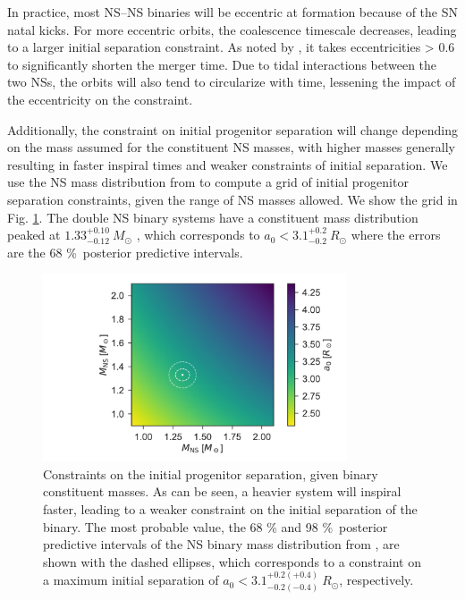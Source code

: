 \documentclass[longauth]{aa}    %
\begin{document}
In practice, most NS--NS binaries will be eccentric at formation because of the SN
natal kicks. For more eccentric orbits, the coalescence timescale decreases,
leading to a larger initial separation constraint. As noted by
\citet{Postnov2014}, it takes eccentricities > 0.6 to significantly shorten the
merger time. Due to tidal interactions between the two NSs, the orbits will also
tend to circularize with time, lessening the impact of the eccentricity on the
constraint.

Additionally, the constraint on initial progenitor separation will change
depending on the mass assumed for the constituent NS masses, with higher masses
generally resulting in faster inspiral times and weaker constraints of initial
separation. We use the NS mass distribution from \citet{Kiziltan2013} to compute
a grid of initial progenitor separation constraints, given the range of NS
masses allowed. We show the grid in Fig. \ref{fig:prog_sep}. The double NS
binary systems have a constituent mass distribution peaked at
$1.33^{+0.10}_{-0.12}~M_\odot$ \citep{Kiziltan2013}, which corresponds to  $a_0 <
3.1^{+0.2}_{-0.2}~R_\odot$ where the errors are the 68 \%\ posterior
predictive intervals.

\begin{figure}
        \centering
       \includegraphics[width=9cm]{figures/prog_sep.pdf}
        \caption{Constraints on the initial progenitor separation, given binary constituent masses. As can be seen, a heavier system will inspiral faster, leading to a weaker constraint on the initial separation of the binary. The most probable value, the 68 \% and 98 \%\ posterior predictive intervals of the NS binary mass distribution from \citet{Kiziltan2013}, are shown with the dashed ellipses, which corresponds to a constraint on a maximum initial separation of $a_0 <3.1^{+0.2(+0.4)}_{-0.2(-0.4)}~R_\odot$, respectively.}
        \label{fig:prog_sep}
\end{figure}
\end{document}

